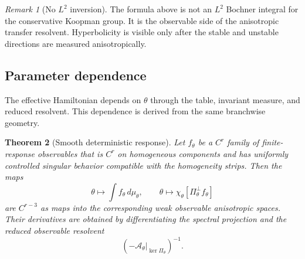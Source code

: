 \documentclass[12pt, letterpaper]{amsart}
\newcommand{\Acal}{\mathcal{A}}
\theoremstyle{plain}
\newtheorem{theorem}{Theorem}[section]
\theoremstyle{definition}
\theoremstyle{remark}
\newtheorem{remark}[theorem]{Remark}
\begin{document}
\begin{remark}[No $L^2$ inversion]
The formula above is not an $L^2$ Bochner integral for the conservative Koopman group.  It is the observable side of the anisotropic transfer resolvent.  Hyperbolicity is visible only after the stable and unstable directions are measured anisotropically.
\end{remark}

\subsection{Parameter dependence}

The effective Hamiltonian depends on $\theta$ through the table, invariant measure, and reduced resolvent.  This dependence is derived from the same branchwise geometry.


\begin{theorem}[Smooth deterministic response]
\label{thm:parameter_response}
Let $f_\theta$ be a $C^{r}$ family of finite-response observables that is
$C^r$ on homogeneous components and has uniformly controlled singular behavior
compatible with the homogeneity strips.  Then the maps
\begin{equation}
    \theta\mapsto \int f_\theta\,d\mu_\theta,
    \qquad
    \theta\mapsto \chi_\theta[\Pi_\theta^\perp f_\theta]
\end{equation}
are $C^{r-3}$ as maps into the corresponding weak observable anisotropic
spaces.  Their derivatives are obtained by differentiating the spectral
projection and the reduced observable resolvent
\begin{equation}
    (-\Acal_\theta|_{\ker\Pi_\theta})^{-1} .
\end{equation}
\end{theorem}
\end{document}
